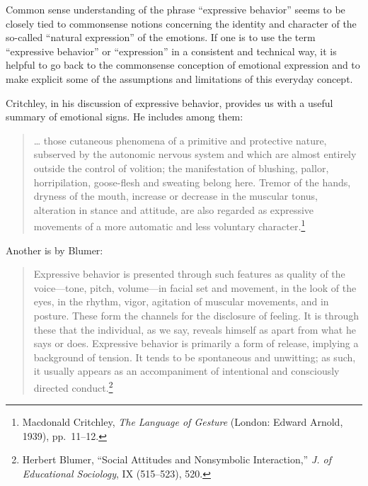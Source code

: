 \documentclass[twoside,symmetric,nobib,justified]{tufte-book}
\begin{document}
Common sense understanding of the phrase ``expressive behavior'' seems
to be closely tied to commonsense notions concerning the identity and
character of the so-called ``natural expression'' of the emotions. If
one is to use the term ``expressive behavior'' or ``expression'' in a
consistent and technical way, it is helpful to go back to the
commonsense conception of emotional expression and to make explicit some
of the assumptions and limitations of this everyday concept.

Critchley, in his discussion of expressive behavior, provides us with a
useful summary of emotional signs. He includes among them:

\begin{quote}
\ldots{} those cutaneous phenomena of a primitive and protective nature,
subserved by the autonomic nervous system and which are almost entirely
outside the control of volition; the manifestation of blushing, pallor,
horripilation, goose-flesh and sweating belong here. Tremor of the
hands, dryness of the mouth, increase or decrease in the muscular tonus,
alteration in stance and attitude, are also regarded as expressive
movements of a more automatic and less voluntary character.\footnote{Macdonald
  Critchley, \emph{The Language of Gesture} (London: Edward Arnold,
  1939), pp.~11--12.}
\end{quote}

\noindent Another is by Blumer:

\begin{quote}
Expressive behavior is presented through such features as quality of the
voice---tone, pitch, volume---in facial set and movement, in the look of
the eyes, in the rhythm, vigor, agitation of muscular movements, and in
posture. These form the channels for the disclosure of feeling. It is
through these that the individual, as we say, reveals himself as apart
from what he says or does. Expressive behavior is primarily a form of
release, implying a background of tension. It tends to be spontaneous
and unwitting; as such, it usually appears as an accompaniment of
intentional and consciously directed conduct.\footnote{Herbert Blumer,
  ``Social Attitudes and Nonsymbolic Interaction,'' \emph{J. of
  Educational Sociology}, IX (515--523), 520.}
\end{quote}
\end{document}
